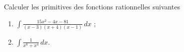 
\begin{exercice}\label{exoanalyseCTU-0105}

Calculer les primitives des fonctions rationnelles suivantes

\begin{multicols}{2}
  \begin{enumerate}
  \item $\displaystyle \int \frac{15x^2-4x-81}{(x-3)(x+4)(x-1)}\, dx$ ;
  \item $\displaystyle \int \frac{1}{x^6+x^4}\, dx$.
  \end{enumerate}
\end{multicols}

\end{exercice}


